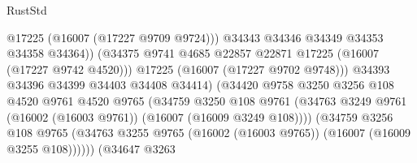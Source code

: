 \begin{lexlean}{RustStd}
\begin{coremodule}
                                              @17225
                                              (@16007 (@17227 @9709 @9724)))
                                            @34343
                                            @34346
                                            @34349
                                            @34353
                                            @34358
                                            @34364))
                                        (@34375
                                          @9741
                                          @4685
                                          @22857
                                          @22871
                                          @17225
                                          (@16007 (@17227 @9742 @4520)))
                                        @17225
                                        (@16007 (@17227 @9702 @9748)))
                                      @34393
                                      @34396
                                      @34399
                                      @34403
                                      @34408
                                      @34414)
                                    (@34420
                                      @9758
                                      @3250
                                      @3256
                                      @108
                                      @4520
                                      @9761
                                      @4520
                                      @9765
                                      (@34759
                                        @3250
                                        @108
                                        @9761
                                        (@34763
                                          @3249
                                          @9761
                                          (@16002 (@16003 @9761))
                                          (@16007 (@16009 @3249 @108))))
                                      (@34759
                                        @3256
                                        @108
                                        @9765
                                        (@34763
                                          @3255
                                          @9765
                                          (@16002 (@16003 @9765))
                                          (@16007 (@16009 @3255 @108))))))
                                  (@34647
                                    @3263

\end{coremodule}
\end{lexlean}
